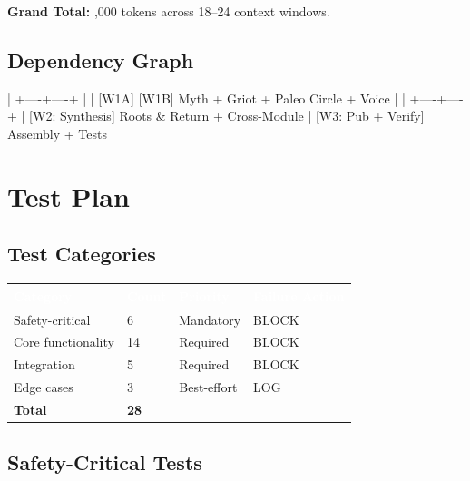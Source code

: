 \documentclass[11pt,letterpaper]{article}
\newcommand{\tableheader}[1]{\textbf{\sffamily\textcolor{white}{#1}}}
\begin{document}
\textbf{Grand Total:} ,000 tokens across 18--24 context windows.

\subsection{Dependency Graph}

\begin{asciibox}
          |
     +----+----+
     |         |
  [W1A]     [W1B]
  Myth +    Griot +
  Paleo     Circle +
            Voice
     |         |
     +----+----+
          |
     [W2: Synthesis]
     Roots & Return +
     Cross-Module
          |
     [W3: Pub + Verify]
     Assembly + Tests
\end{asciibox}

\section{Test Plan}

\subsection{Test Categories}

\begin{center}
\begin{tabularx}{\textwidth}{L{3cm}C{1.5cm}C{1.5cm}C{2cm}}
\toprule
{}
\tableheader{Category} & \tableheader{Count} & \tableheader{Priority} & \tableheader{Failure Action} \\
\midrule
Safety-critical & 6 & Mandatory & BLOCK \\
Core functionality & 14 & Required & BLOCK \\
Integration & 5 & Required & BLOCK \\
Edge cases & 3 & Best-effort & LOG \\
\midrule
\textbf{Total} & \textbf{28} & & \\
\bottomrule
\end{tabularx}
\end{center}

\subsection{Safety-Critical Tests}
\end{document}
